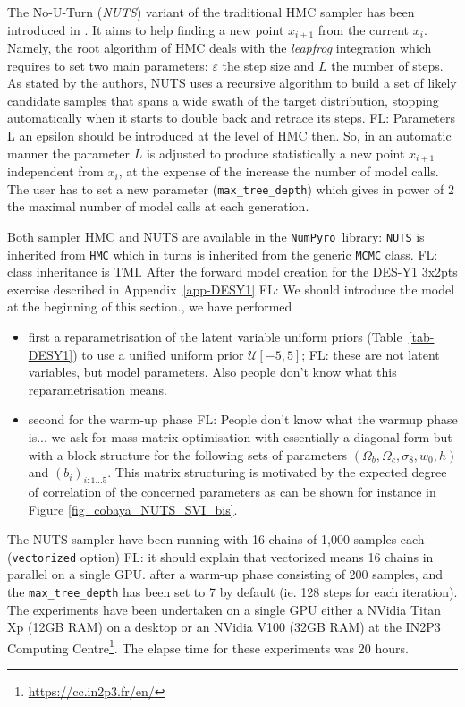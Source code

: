 \documentclass[twocolumn,twocolappendix,nofootinbib,iop]{openjournal}
\newcommand{\FrL}[1]{{\color{cyan}FL: #1}}
\newcommand{\numpyro}{\texttt{NumPyro}}
\begin{document}
The No-U-Turn (\textit{NUTS})  variant of the traditional HMC sampler has been introduced in \citet{nuts}. It aims to help finding a new point  $x_{i+1}$ from  the current $x_i$. Namely, the root algorithm of HMC deals with the \textit{leapfrog} integration which requires to set two main parameters: $\varepsilon$ the step size and $L$ the number of steps. As stated by the authors, NUTS  uses a recursive algorithm to build a set of likely candidate samples that spans a wide swath of the target distribution, stopping automatically when it starts to double back and retrace its steps. \FrL{Parameters L an epsilon should be introduced at the level of HMC then.} So, in an automatic manner the parameter $L$ is adjusted to produce statistically  a new point $x_{i+1}$ independent from $x_i$, at the expense of the increase the number of model calls. The user has to set a new  parameter  (\texttt{max\_tree\_depth}) which gives in power of $2$ the maximal number of model calls at each generation.

Both sampler HMC and NUTS are available in the \numpyro\ library: \texttt{NUTS} is inherited from \texttt{HMC} which in turns is inherited from the generic \texttt{MCMC} class. \FrL{class inheritance is TMI.}  After the forward model creation for the DES-Y1 3x2pts exercise described in Appendix~\ref{app-DESY1} \FrL{We should introduce the model at the beginning of this section.}, we have performed 
\begin{itemize}
    \item first a reparametrisation of the latent variable uniform priors (Table~\ref{tab-DESY1}) to use a unified uniform prior $\mathcal{U}[-5,5]$; \FrL{these are not latent variables, but model parameters. Also people don't know what this reparametrisation means.}
    \item second for the warm-up phase \FrL{People don't know what the warmup phase is...} we ask for mass matrix optimisation with essentially a diagonal form but with a block structure for the following sets of parameters $(\Omega_b,\Omega_c,\sigma_8,w_0,h)$ and $(b_i)_{i:1\dots5}$. This matrix structuring is motivated by the expected degree of correlation of the concerned parameters as can be shown for instance in Figure \ref{fig_cobaya_NUTS_SVI_bis}.
\end{itemize}
The NUTS sampler have been running with 16 chains of 1,000 samples each (\texttt{vectorized} option) \FrL{it should explain that vectorized means 16 chains in parallel on a single GPU.} after a warm-up phase consisting of 200 samples, and the \texttt{max\_tree\_depth} has been set to 7 by default (ie. 128 steps for each iteration). The experiments have been undertaken on a single GPU either a NVidia Titan Xp (12GB RAM) on a desktop or an NVidia V100 (32GB RAM) at the IN2P3 Computing Centre\footnote{\url{https://cc.in2p3.fr/en/}}. The elapse time for these experiments was 20 hours.
\end{document}

